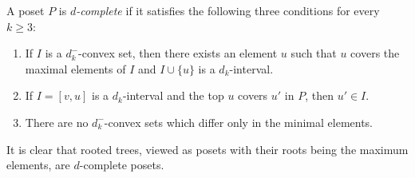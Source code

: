 \documentclass[ALCO,ThmDefs,Unicode,epreuves]{cedram}
\begin{document}
\begin{defi}
\label{def:dc_poset}
A poset $P$ is \emph{$d$-complete} if it satisfies 
the following three conditions for every $k \ge 3$:
\begin{enumerate}[(D1)]
\item\label{defi2.1_D1} %
If $I$ is a $d_k^-$-convex set, then there exists an element $u$ 
such that $u$ covers the maximal elements of $I$ and 
$I \cup \{ u \}$ is a $d_k$-interval.
\item\label{defi2.1_D2} %
If $I = [v,u]$ is a $d_k$-interval and the top $u$ covers $u'$ in $P$, 
then $u' \in I$.
\item\label{defi2.1_D3} %
There are no $d_k^-$-convex sets which differ only in the minimal elements.
\end{enumerate}
\end{defi}

It is clear that rooted trees, viewed as posets with their roots being the maximum elements, 
are $d$-complete posets.
\end{document}
